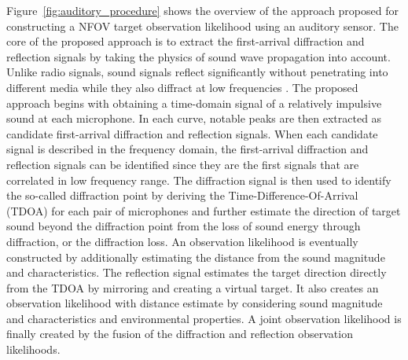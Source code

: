\documentclass[letterpaper, 10 pt, conference]{ieeeconf}  %
\begin{document}
Figure~\ref{fig:auditory_procedure} shows the overview of the approach proposed for constructing a NFOV target observation likelihood using an auditory sensor.  The core of the proposed approach is to extract the first-arrival diffraction and reflection signals by taking the physics of sound wave propagation into account.  Unlike radio signals, sound signals reflect significantly without penetrating into different media while they also diffract at low frequencies \cite{bellusci2007ultra}.  The proposed approach begins with obtaining a time-domain signal of a relatively impulsive sound at each microphone.  In each curve, notable peaks are then extracted as candidate first-arrival diffraction and reflection signals.  When each candidate signal is described in the frequency domain, the first-arrival diffraction and reflection signals can be identified since they are the first signals that are correlated in low frequency range.  The diffraction signal is then used to identify the so-called diffraction point by deriving the Time-Difference-Of-Arrival (TDOA) for each pair of microphones and further estimate the direction of target sound beyond the diffraction point from the loss of sound energy through diffraction, or the diffraction loss.  An observation likelihood is eventually constructed by additionally estimating the distance from the sound magnitude and characteristics.  The reflection signal estimates the target direction directly from the TDOA by mirroring and creating a virtual target.  It also creates an observation likelihood with distance estimate by considering sound magnitude and characteristics and environmental properties.  A joint observation likelihood is finally created by the fusion of the diffraction and reflection observation likelihoods.  
\end{document}
